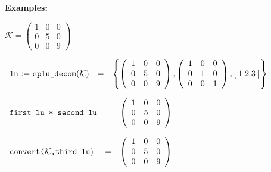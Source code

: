\textbf{Examples:}

\begin{flushleft}
\hspace*{0.175in}
\begin{math}  
\mathcal{K} = \left( \begin{array}{ccc} 1 & 0 & 0 \\ 0 & 5 & 0 \\ 0 & 0 & 9
\end{array} \right)
\end{math}  
\end{flushleft}

\begin{flushleft}  
\hspace*{0.1in}
\begin{math}  
\begin{array}{cccc}
$\texttt{lu} := \texttt{splu\_decom}$(\mathcal{K}) & = & 
\left\{ 
        \left( \begin{array}{ccc} 1 & 0 & 0 \\ 0 & 5 & 0 \\ 0 & 0 & 9 \end{array} \right), 
        \left( \begin{array}{ccc} 1 & 0 & 0 \\ 0 & 1 & 0 \\ 0 & 0 & 1 
\end{array} \right), 
	[\; 1 \; 2 \; 3 \; ]
\right\} 
\end{array}
\end{math}  
\end{flushleft}

\vspace*{0.1in}

\begin{flushleft}  
\hspace*{0.1in}
\begin{math}  
\begin{array}{ccc}
$\texttt{first lu * second lu}$ & = & 
        \left( \begin{array}{ccc} 1 & 0 & 0 \\ 0 & 5 & 0 \\ 0 & 0 & 9
 \end{array} \right) 
\end{array}
\end{math}  
\end{flushleft}

\begin{flushleft}  
\hspace*{0.1in}
\begin{math}  
\begin{array}{ccc}
$\texttt{convert($\mathcal{K}$,third lu}$) \hspace*{0.055in} & = & 
        \left( \begin{array}{ccc} 1 & 0 & 0 \\ 0 & 5 & 0 \\ 0 & 0 & 9
 \end{array} \right) 
\end{array}
\end{math}  
\end{flushleft}

